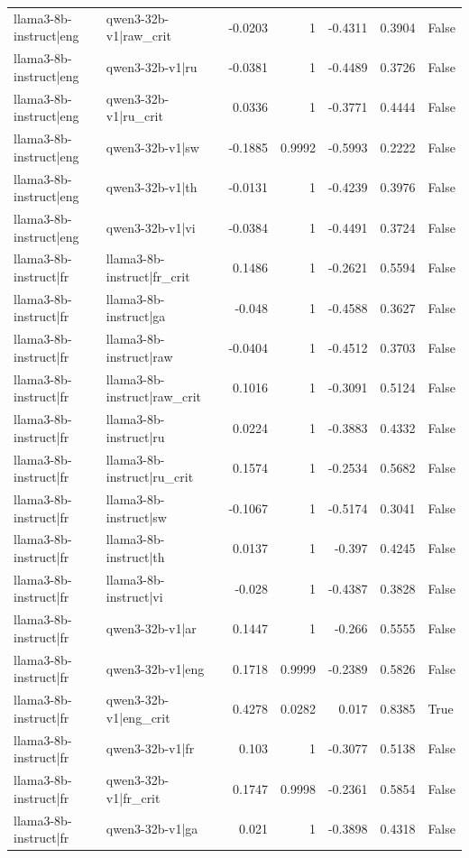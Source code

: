 \begin{table}
\begin{tabular}{l l r r r r l}
llama3-8b-instruct|eng & qwen3-32b-v1|raw_crit & -0.0203 & 1 & -0.4311 & 0.3904 & False \\
llama3-8b-instruct|eng & qwen3-32b-v1|ru & -0.0381 & 1 & -0.4489 & 0.3726 & False \\
llama3-8b-instruct|eng & qwen3-32b-v1|ru_crit & 0.0336 & 1 & -0.3771 & 0.4444 & False \\
llama3-8b-instruct|eng & qwen3-32b-v1|sw & -0.1885 & 0.9992 & -0.5993 & 0.2222 & False \\
llama3-8b-instruct|eng & qwen3-32b-v1|th & -0.0131 & 1 & -0.4239 & 0.3976 & False \\
llama3-8b-instruct|eng & qwen3-32b-v1|vi & -0.0384 & 1 & -0.4491 & 0.3724 & False \\
llama3-8b-instruct|fr & llama3-8b-instruct|fr_crit & 0.1486 & 1 & -0.2621 & 0.5594 & False \\
llama3-8b-instruct|fr & llama3-8b-instruct|ga & -0.048 & 1 & -0.4588 & 0.3627 & False \\
llama3-8b-instruct|fr & llama3-8b-instruct|raw & -0.0404 & 1 & -0.4512 & 0.3703 & False \\
llama3-8b-instruct|fr & llama3-8b-instruct|raw_crit & 0.1016 & 1 & -0.3091 & 0.5124 & False \\
llama3-8b-instruct|fr & llama3-8b-instruct|ru & 0.0224 & 1 & -0.3883 & 0.4332 & False \\
llama3-8b-instruct|fr & llama3-8b-instruct|ru_crit & 0.1574 & 1 & -0.2534 & 0.5682 & False \\
llama3-8b-instruct|fr & llama3-8b-instruct|sw & -0.1067 & 1 & -0.5174 & 0.3041 & False \\
llama3-8b-instruct|fr & llama3-8b-instruct|th & 0.0137 & 1 & -0.397 & 0.4245 & False \\
llama3-8b-instruct|fr & llama3-8b-instruct|vi & -0.028 & 1 & -0.4387 & 0.3828 & False \\
llama3-8b-instruct|fr & qwen3-32b-v1|ar & 0.1447 & 1 & -0.266 & 0.5555 & False \\
llama3-8b-instruct|fr & qwen3-32b-v1|eng & 0.1718 & 0.9999 & -0.2389 & 0.5826 & False \\
llama3-8b-instruct|fr & qwen3-32b-v1|eng_crit & 0.4278 & 0.0282 & 0.017 & 0.8385 & True \\
llama3-8b-instruct|fr & qwen3-32b-v1|fr & 0.103 & 1 & -0.3077 & 0.5138 & False \\
llama3-8b-instruct|fr & qwen3-32b-v1|fr_crit & 0.1747 & 0.9998 & -0.2361 & 0.5854 & False \\
llama3-8b-instruct|fr & qwen3-32b-v1|ga & 0.021 & 1 & -0.3898 & 0.4318 & False \\

\end{tabular}
\end{table}
